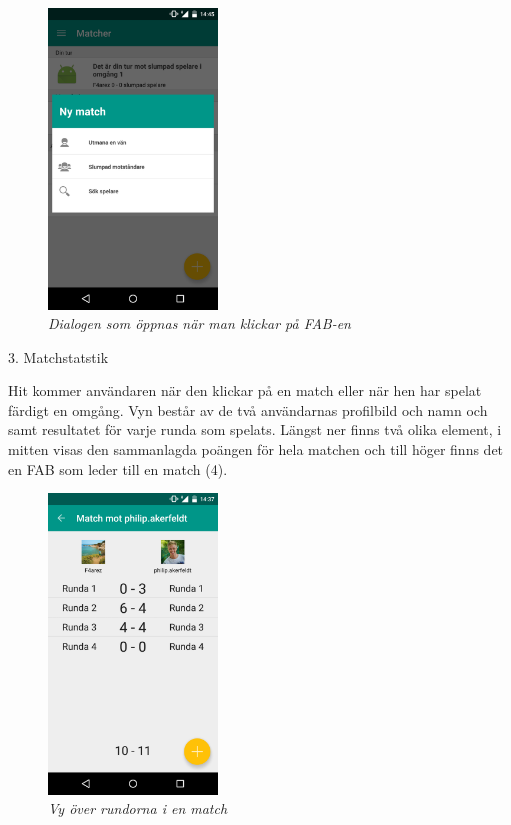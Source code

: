 \documentclass[a4paper, 11pt]{article}
\begin{document}
\begin{figure}[H]
\begin{center}
	\includegraphics[width=0.4\textwidth]{app_new_match} 
	\caption{\textit{Dialogen som öppnas när man klickar på FAB-en}}
	\end{center}
\end{figure}

\pagebreak
\large \textup{3. Matchstatstik}

Hit kommer användaren när den klickar på en match eller när hen har spelat färdigt en omgång. Vyn består av de två användarnas profilbild och namn och samt resultatet för varje runda som spelats. Längst ner finns två olika element, i mitten visas den sammanlagda poängen för hela matchen och till höger finns det en FAB som leder till en match (4).  


\begin{figure}[H]
	\begin{center}
	\includegraphics[width=0.4\textwidth]{app_match_stats} 
	\end{center}
	\caption{\textit{Vy över rundorna i en match}}
\end{figure}
\end{document}
